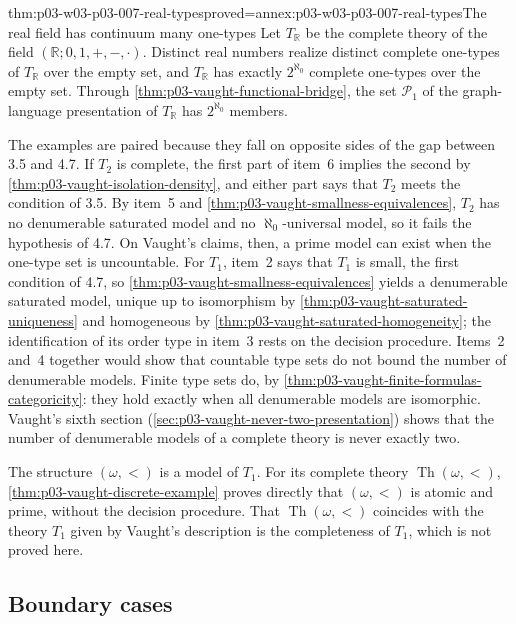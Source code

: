 \begin{hblemma}{thm:p03-w03-p03-007-real-types}{proved=annex:p03-w03-p03-007-real-types}{The real field has continuum many one-types}
Let \(T_{\mathbb R}\) be the complete theory of the field
\((\mathbb R;0,1,+,-,\cdot)\). Distinct real numbers realize distinct
complete one-types of \(T_{\mathbb R}\) over the empty set, and
\(T_{\mathbb R}\) has exactly \(2^{\aleph_0}\) complete one-types over the
empty set. Through \cref{thm:p03-vaught-functional-bridge}, the set
\(\mathcal P_1\) of the graph-language presentation of \(T_{\mathbb R}\)
has \(2^{\aleph_0}\) members.
\end{hblemma}

The examples are paired because they fall on opposite sides of the gap
between 3.5 and 4.7. If \(T_2\) is complete, the first part of item~6
implies the second by \cref{thm:p03-vaught-isolation-density}, and either
part says that \(T_2\) meets the condition of 3.5. By item~5 and
\cref{thm:p03-vaught-smallness-equivalences}, \(T_2\) has no denumerable
saturated model and no \(\aleph_0\)-universal model, so it fails the
hypothesis of 4.7. On Vaught's claims, then, a prime model can exist when
the one-type set is uncountable. For \(T_1\), item~2 says that \(T_1\) is
small, the first condition of 4.7, so
\cref{thm:p03-vaught-smallness-equivalences} yields a denumerable saturated
model, unique up to isomorphism by \cref{thm:p03-vaught-saturated-uniqueness}
and homogeneous by \cref{thm:p03-vaught-saturated-homogeneity}; the
identification of its order type in item~3 rests on the decision procedure.
Items~2 and~4 together would show that countable type sets do not bound
the number of denumerable models. Finite type sets do, by
\cref{thm:p03-vaught-finite-formulas-categoricity}: they hold exactly when
all denumerable models are isomorphic. Vaught's sixth section
(\cref{sec:p03-vaught-never-two-presentation}) shows that the number of
denumerable models of a complete theory is never exactly two.

The structure \((\omega,<)\) is a model of \(T_1\). For its complete theory
\(\operatorname{Th}(\omega,<)\), \cref{thm:p03-vaught-discrete-example}
proves directly that \((\omega,<)\) is atomic and prime, without the
decision procedure. That \(\operatorname{Th}(\omega,<)\) coincides with the
theory \(T_1\) given by Vaught's description is the completeness of \(T_1\),
which is not proved here.

\subsection{Boundary cases}
\label{sec:p03-w03-p03-007-boundaries}


